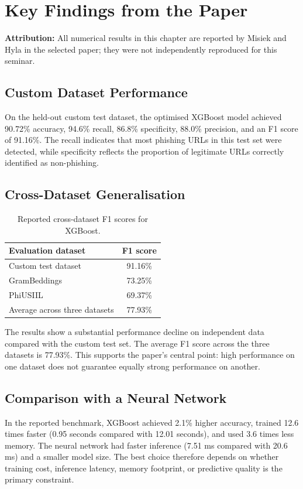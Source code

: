 \chapter{Key Findings from the Paper}
\setcounter{equation}{0}
\noindent\textbf{Attribution:} All numerical results in this chapter are reported by Misiek and Hyla in the selected paper; they were not independently reproduced for this seminar.\cite{bib1}

\section{Custom Dataset Performance}
On the held-out custom test dataset, the optimised XGBoost model achieved 90.72\% accuracy, 94.6\% recall, 86.8\% specificity, 88.0\% precision, and an F1 score of 91.16\%. The recall indicates that most phishing URLs in this test set were detected, while specificity reflects the proportion of legitimate URLs correctly identified as non-phishing.\cite{bib1}

\section{Cross-Dataset Generalisation}
\begin{table}[htbp]
\centering
\begin{tabular}{lc}
\hline
\textbf{Evaluation dataset} & \textbf{F1 score}\\
\hline
Custom test dataset & 91.16\%\\
GramBeddings & 73.25\%\\
PhiUSIIL & 69.37\%\\
\hline
Average across three datasets & 77.93\%\\
\hline
\end{tabular}
\caption{Reported cross-dataset F1 scores for XGBoost.}
\label{tab:cross_dataset_f1}
\end{table}
The results show a substantial performance decline on independent data compared with the custom test set. The average F1 score across the three datasets is 77.93\%. This supports the paper's central point: high performance on one dataset does not guarantee equally strong performance on another.\cite{bib1}

\section{Comparison with a Neural Network}
In the reported benchmark, XGBoost achieved 2.1\% higher accuracy, trained 12.6 times faster (0.95 seconds compared with 12.01 seconds), and used 3.6 times less memory. The neural network had faster inference (7.51 ms compared with 20.6 ms) and a smaller model size. The best choice therefore depends on whether training cost, inference latency, memory footprint, or predictive quality is the primary constraint.\cite{bib1}

